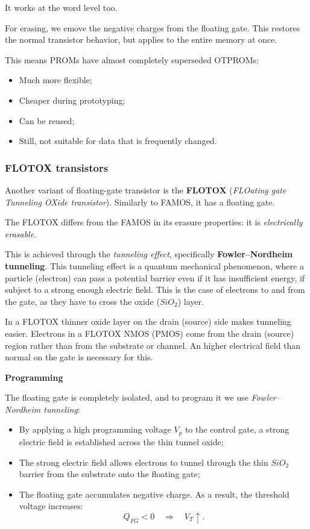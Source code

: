 \documentclass[a4paper,11pt]{article}
\begin{document}
It works at the word level too.

For erasing, we emove the negative charges from the floating gate.
This restores the normal transistor behavior, but applies to the entire memory at once.

This means PROMs have almost completely superseded OTPROMs:
\begin{itemize}
	\item Much more flexible;
	\item Cheaper during prototyping;
	\item Can be reused;
	\item Still, not suitable for data that is frequently changed.
\end{itemize}

\subsubsection{FLOTOX transistors}

Another variant of floating-gate transistor is the \textbf{FLOTOX} (\textit{FLOating gate Tunneling OXide transistor}). Similarly to FAMOS, it has a floating gate.

The FLOTOX differs from the FAMOS in its erasure properties: it is \textit{electrically erasable}.

This is achieved through the \textit{tunneling effect}, specifically \textbf{Fowler–Nordheim tunneling}.
This tunneling effect is  a quantum mechanical phenomenon, where a particle (electron) can pass a potential barrier even if it has insufficient energy, if subject to a strong enough electric field.
This is the case of electrons to and from the gate, as they have to cross the oxide ($SiO_2$) layer.

In a FLOTOX thinner oxide layer on the drain (source) side makes tunneling easier.
Electrons in a FLOTOX NMOS (PMOS) come from the drain (source) region rather than from the substrate or channel.
An higher electrical field than normal on the gate is necessary for this.

\par\smallskip
\textbf{\textsf{Programming}}

The floating gate is completely isolated, and to program it we use
\textit{Fowler--Nordheim tunneling}:
\begin{itemize}
	\item By applying a high programming voltage $V_p$ to the control
	      gate, a strong electric field is established across the thin
	      tunnel oxide;

	\item The strong electric field allows electrons to tunnel through
	      the thin $SiO_2$ barrier from the substrate onto the floating gate;

	\item The floating gate accumulates negative charge. As a result,
	      the threshold voltage increases:
	      \[
		      Q_{FG}<0 \quad\Rightarrow\quad V_T \uparrow.
	      \]
\end{itemize}
\end{document}
